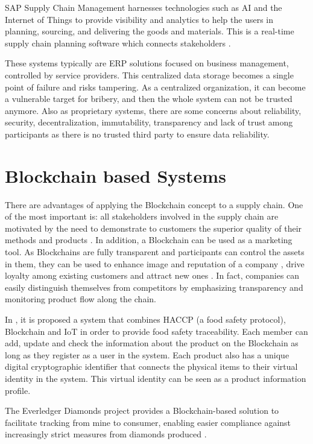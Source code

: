 SAP Supply Chain Management harnesses technologies such as AI and the Internet of Things to provide visibility and  analytics to help the users in planning, sourcing, and delivering the goods and materials.  This is a real-time supply chain planning software which connects stakeholders \cite{snapp2010discover}.

These systems typically are ERP solutions focused on business management, controlled by service providers.  This centralized data  storage becomes a single point of failure and risks tampering. As a centralized organization, it can become a vulnerable target for  bribery, and then the whole system can not be trusted anymore. Also as proprietary systems, there are some concerns about reliability, security, decentralization, immutability, transparency and lack of trust among participants as there is no trusted third party to ensure data reliability. 

\section{Blockchain based Systems} \label{sec:BlockchainBasedSystems}

There are advantages of applying the Blockchain concept to a supply chain. One of the most important is: all stakeholders involved in the supply chain are motivated by the need to demonstrate to customers the superior quality of their methods and products \cite{lu2017adaptable}. In addition, a Blockchain can be used as a marketing tool. As Blockchains are fully transparent and participants can control the assets in them, they can be used to enhance image and reputation of a company \cite{van2007essentials}, drive loyalty among existing customers \cite{pizzuti2015global} and attract new ones \cite{svensson2009transparency}. In fact, companies can easily distinguish themselves from competitors by emphasizing transparency and monitoring product flow along the chain. 

In \cite{tian2017supply}, it is proposed a system that combines HACCP (a food safety protocol), Blockchain and IoT in order to provide food safety traceability. Each member can add, update and check the information about the product on the Blockchain as long as they register as a user in the system. Each product also has a unique digital cryptographic identifier that connects the physical items to their virtual identity in the system. This virtual identity can be seen as a product information profile.

The Everledger Diamonds project provides a Blockchain-based solution to facilitate tracking from mine to consumer, enabling easier compliance against increasingly strict measures from diamonds produced \cite{crosby2016blockchain}.

